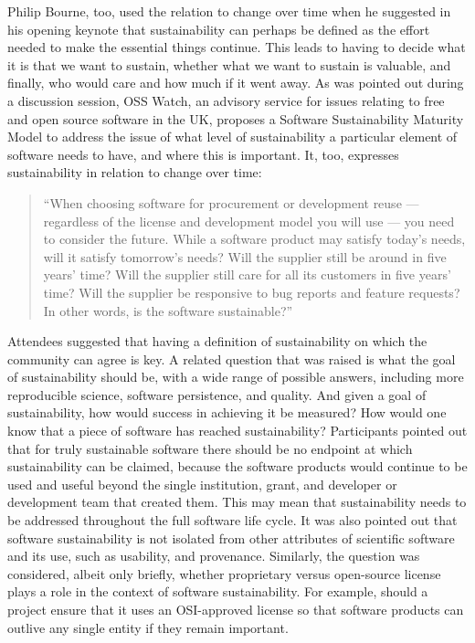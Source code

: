 \documentclass[11pt, oneside]{amsart}
\begin{document}
Philip Bourne, too, used the relation to change over time when he
suggested in his opening keynote that sustainability can perhaps be
defined as the effort needed to make the essential things continue.
This leads to having to decide what it is that we want to sustain,
whether what we want to sustain is valuable, and finally, who would
care and how much if it went away. As was pointed out during a
discussion session, OSS Watch, an advisory service for issues relating
to free and open source software in the UK, proposes a Software
Sustainability Maturity Model to address the issue of what level of
sustainability a particular element of software needs to have, and
where this is important. It, too, expresses sustainability in relation
to change over time:
\begin{quote}``When choosing software for procurement or
development reuse --- regardless of the license and development model
you will use --- you need to consider the future. While a software
product may satisfy today's needs, will it satisfy tomorrow's needs?
Will the supplier still be around in five years' time? Will the
supplier still care for all its customers in five years' time? Will
the supplier be responsive to bug reports and feature requests? In
other words, is the software sustainable?''~\cite{OSS-ssmm-web}
\end{quote}

Attendees suggested that having a definition of sustainability on
which the community can agree is key.  A related question that was
raised is what the goal of sustainability should be, with a wide range
of possible answers, including more reproducible science, software
persistence, and quality.  And given a goal of sustainability, how
would success in achieving it be measured?  How would one know that a
piece of software has reached sustainability? Participants pointed out
that for truly sustainable software there should be no endpoint at
which sustainability can be claimed, because the software products
would continue to be used and useful beyond the single institution,
grant, and developer or development team that created them. This may
mean that sustainability needs to be addressed throughout the full
software life cycle.  It was also pointed out that software
sustainability is not isolated from other attributes of scientific
software and its use, such as usability, and provenance. Similarly,
the question was considered, albeit only briefly, whether proprietary
versus open-source license plays a role in the context of software
sustainability. For example, should a project ensure that it uses an
OSI-approved license so that software products can outlive any single
entity if they remain important.
\end{document}

